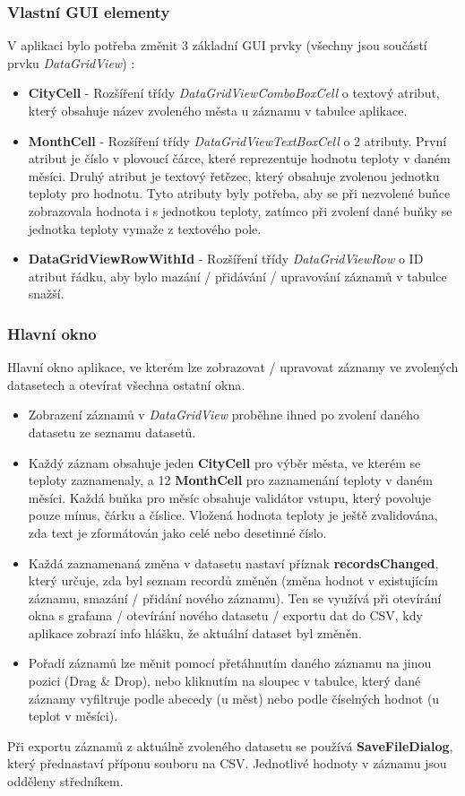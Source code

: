 \documentclass[12pt, a4paper]{article}
\begin{document}
\subsubsection{Vlastní GUI elementy}
V aplikaci bylo potřeba změnit 3 základní GUI prvky (všechny jsou součástí prvku \textit{DataGridView}) :
\begin{itemize}
\item \textbf{CityCell} - Rozšíření třídy \textit{DataGridViewComboBoxCell} o textový atribut, který obsahuje název zvoleného města u záznamu v tabulce aplikace.
\item \textbf{MonthCell} - Rozšíření třídy \textit{DataGridViewTextBoxCell}  o 2 atributy. První atribut je číslo v plovoucí čárce, které reprezentuje hodnotu teploty v daném měsíci. Druhý atribut je textový řetězec, který obsahuje zvolenou jednotku teploty pro hodnotu. Tyto atributy byly potřeba, aby se při nezvolené buňce zobrazovala hodnota i s jednotkou teploty, zatímco při zvolení dané buňky se jednotka teploty vymaže z textového pole.
\item \textbf{DataGridViewRowWithId} - Rozšíření třídy \textit{DataGridViewRow} o ID atribut řádku, aby bylo mazání / přidávání / upravování záznamů v tabulce snažší.
\end{itemize}

\subsubsection{Hlavní okno}
Hlavní okno aplikace, ve kterém lze zobrazovat / upravovat záznamy ve zvolených datasetech a otevírat všechna ostatní okna. 
\begin{itemize}
\item Zobrazení záznamů v \textit{DataGridView} proběhne ihned po zvolení daného datasetu ze seznamu datasetů.
\item Každý záznam obsahuje jeden \textbf{CityCell} pro výběr města, ve kterém se teploty zaznamenaly, a 12 \textbf{MonthCell} pro zaznamenání teploty v daném měsíci. Každá buňka pro měsíc obsahuje validátor vstupu, který povoluje pouze mínus, čárku a číslice. Vložená hodnota teploty je ještě zvalidována, zda text je zformátován jako celé nebo desetinné číslo.
\item Každá zaznamenaná změna v datasetu nastaví příznak \textbf{recordsChanged}, který určuje, zda byl seznam recordů změněn (změna hodnot v existujícím záznamu, smazání / přidání nového záznamu). Ten se využívá při otevírání okna s grafama / otevírání nového datasetu / exportu dat do CSV, kdy aplikace zobrazí info hlášku, že aktuální dataset byl změněn.
\item Pořadí záznamů lze měnit pomocí přetáhnutím daného záznamu na jinou pozici (Drag \& Drop), nebo kliknutím na sloupec v tabulce, který dané záznamy vyfiltruje podle abecedy (u měst) nebo podle číselných hodnot (u teplot v měsíci).
\end{itemize}
Při exportu záznamů z aktuálně zvoleného datasetu se používá \textbf{SaveFileDialog}, který přednastaví příponu souboru na CSV. Jednotlivé hodnoty v záznamu jsou odděleny středníkem.
\end{document}

